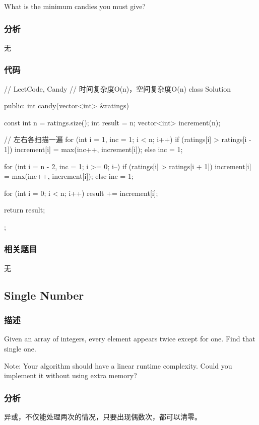 What is the minimum candies you must give?


\subsubsection{分析}
无


\subsubsection{代码}
\begin{Code}
// LeetCode, Candy
// 时间复杂度O(n)，空间复杂度O(n)
class Solution {
public:
    int candy(vector<int> &ratings) {
        const int n = ratings.size();
        int result = n;
        vector<int> increment(n);

        // 左右各扫描一遍
        for (int i = 1, inc = 1; i < n; i++)
            if (ratings[i] > ratings[i - 1])
                increment[i] = max(inc++, increment[i]);
            else
                inc = 1;

        for (int i = n - 2, inc = 1; i >= 0; i--)
            if (ratings[i] > ratings[i + 1])
                increment[i] = max(inc++, increment[i]);
            else
                inc = 1;

        for (int i = 0; i < n; i++)
            result += increment[i];

        return result;
    }
};
\end{Code}


\subsubsection{相关题目}
\begindot
\item 无
\myenddot


\subsection{Single Number} %
\label{sec:single-number}


\subsubsection{描述}
Given an array of integers, every element appears twice except for one. Find that single one.

Note:
Your algorithm should have a linear runtime complexity. Could you implement it without using extra memory?


\subsubsection{分析}
异或，不仅能处理两次的情况，只要出现偶数次，都可以清零。


